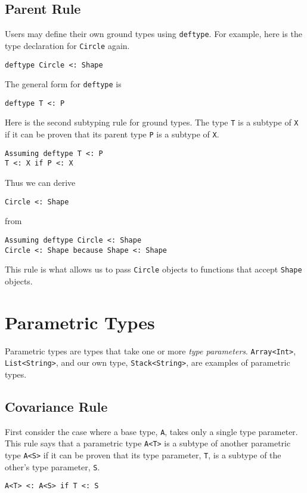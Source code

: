 \documentclass[10pt,oneside]{book}
\begin{document}
\subsection*{Parent Rule}
Users may define their own ground types using \texttt{\frenchspacing deftype}. For example, here is the type declaration for \texttt{\frenchspacing Circle} again.
\begin{lstlisting}
deftype Circle <: Shape
\end{lstlisting}

The general form for \texttt{\frenchspacing deftype} is
\begin{lstlisting}
deftype T <: P
\end{lstlisting}

Here is the second subtyping rule for ground types. The type \texttt{\frenchspacing T} is a subtype of \texttt{\frenchspacing X} if it can be proven that its parent type \texttt{\frenchspacing P} is a subtype of \texttt{\frenchspacing X}.
\begin{lstlisting}
Assuming deftype T <: P
T <: X if P <: X
\end{lstlisting}

Thus we can derive
\begin{lstlisting}
Circle <: Shape
\end{lstlisting}
from
\begin{lstlisting}
Assuming deftype Circle <: Shape
Circle <: Shape because Shape <: Shape
\end{lstlisting}

This rule is what allows us to pass \texttt{\frenchspacing Circle} objects to functions that accept \texttt{\frenchspacing Shape} objects.

\section{Parametric Types}
Parametric types are types that take one or more {\em type parameters}. \texttt{\frenchspacing Array<Int>}, \texttt{\frenchspacing List<String>}, and our own type, \texttt{\frenchspacing Stack<String>}, are examples of parametric types.

\subsection*{Covariance Rule}
First consider the case where a base type, \texttt{\frenchspacing A}, takes only a single type parameter. This rule says that a parametric type \texttt{\frenchspacing A<T>} is a subtype of another parametric type \texttt{\frenchspacing A<S>} if it can be proven that its type parameter, \texttt{\frenchspacing T}, is a subtype of the other's type parameter, \texttt{\frenchspacing S}.
\begin{lstlisting}
A<T> <: A<S> if T <: S
\end{lstlisting}
\end{document}
